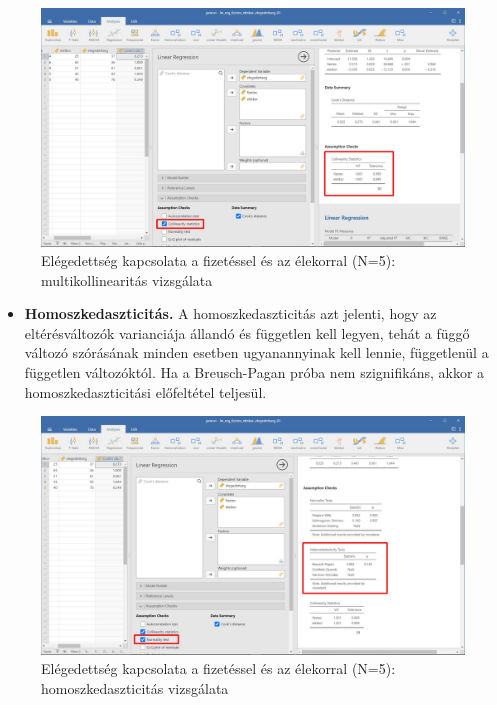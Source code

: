 \documentclass[
  letterpaper,
]{krantz}
\providecommand{\tightlist}{%
  \setlength{\itemsep}{0pt}\setlength{\parskip}{0pt}}\usepackage{longtable,booktabs,array}
\begin{document}
\begin{figure}

{\centering \includegraphics{./images/lin_reg_fizetes_eletkor_elegedettseg_01_kep_07.jpg}

}

\caption{Elégedettség kapcsolata a fizetéssel és az élekorral (N=5):
multikollinearitás vizsgálata}

\end{figure}

\begin{itemize}
\tightlist
\item
  \textbf{Homoszkedaszticitás.} A homoszkedaszticitás azt jelenti, hogy
  az eltérésváltozók varianciája állandó és független kell legyen, tehát
  a függő változó szórásának minden esetben ugyanannyinak kell lennie,
  függetlenül a független változóktól. Ha a Breusch-Pagan próba nem
  szignifikáns, akkor a homoszkedaszticitási előfeltétel teljesül.
\end{itemize}

\begin{figure}

{\centering \includegraphics{./images/lin_reg_fizetes_eletkor_elegedettseg_01_kep_08.jpg}

}

\caption{Elégedettség kapcsolata a fizetéssel és az élekorral (N=5):
homoszkedaszticitás vizsgálata}

\end{figure}
\end{document}
